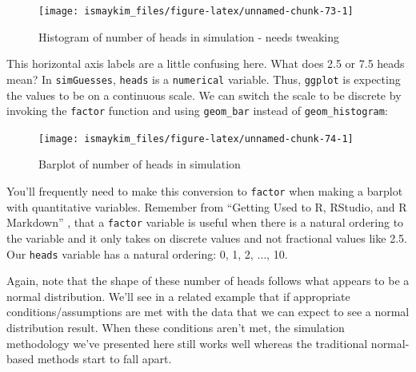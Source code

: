 \documentclass[]{tufte-book}
\newenvironment{Shaded}{\begin{snugshade}}{\end{snugshade}}
\newcommand{\KeywordTok}[1]{\textcolor[rgb]{0.13,0.29,0.53}{\textbf{{#1}}}}
\newcommand{\DataTypeTok}[1]{\textcolor[rgb]{0.13,0.29,0.53}{{#1}}}
\newcommand{\StringTok}[1]{\textcolor[rgb]{0.31,0.60,0.02}{{#1}}}
\newcommand{\NormalTok}[1]{{#1}}
\begin{document}
\begin{figure}

{\centering \texttt{[image: ismaykim\_files/figure-latex/unnamed-chunk-73-1]} 

}

\caption[Histogram of number of heads in simulation - needs tweaking]{Histogram of number of heads in simulation - needs tweaking}\label{fig:unnamed-chunk-73}
\end{figure}

This horizontal axis labels are a little confusing here. What does 2.5
or 7.5 heads mean? In \texttt{simGuesses}, \texttt{heads} is a
\texttt{numerical} variable. Thus, \texttt{ggplot} is expecting the
values to be on a continuous scale. We can switch the scale to be
discrete by invoking the \texttt{factor} function and using
\texttt{geom\_bar} instead of \texttt{geom\_histogram}:

\begin{Shaded}
\end{Shaded}

\begin{figure}

{\centering \texttt{[image: ismaykim\_files/figure-latex/unnamed-chunk-74-1]} 

}

\caption[Barplot of number of heads in simulation]{Barplot of number of heads in simulation}\label{fig:unnamed-chunk-74}
\end{figure}

You'll frequently need to make this conversion to \texttt{factor} when
making a barplot with quantitative variables. Remember from ``Getting
Used to R, RStudio, and R Markdown'' \citep{usedtor2016}, that a
\texttt{factor} variable is useful when there is a natural ordering to
the variable and it only takes on discrete values and not fractional
values like 2.5. Our \texttt{heads} variable has a natural ordering: 0,
1, 2, \(\ldots\), 10.

Again, note that the shape of these number of heads follows what appears
to be a normal distribution. We'll see in a related example that if
appropriate conditions/assumptions are met with the data that we can
expect to see a normal distribution result. When these conditions aren't
met, the simulation methodology we've presented here still works well
whereas the traditional normal-based methods start to fall apart.
\end{document}

